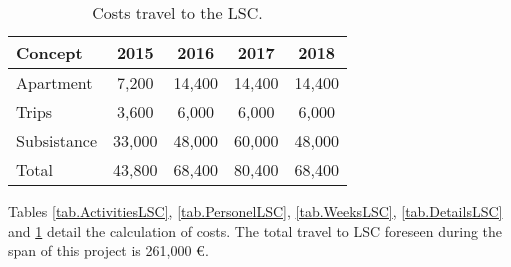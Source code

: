 \begin{table}[h!]
\begin{center}
\begin{tabular}{|l|c|c|c|c|}
\hline	
Concept &	2015 &	2016 &	2017 &	2018\\
\hline						
Apartment	 & 7,200 &	14,400 &	14,400 &14,400 \\
Trips	& 3,600 &	6,000 &	6,000 &	6,000 \\
Subsistance &	33,000 &	48,000	& 60,000 & 48,000 \\
\hline
Total &	43,800 &	68,400 &	80,400 &	68,400 \\				
\hline \hline				
\end{tabular}  
\caption{Costs travel to the LSC.}
\label{tab.CostsLSC}
\end{center}
\end{table}

Tables \ref{tab.ActivitiesLSC}, \ref{tab.PersonelLSC},  
\ref{tab.WeeksLSC}, \ref{tab.DetailsLSC} and  \ref{tab.CostsLSC} detail the calculation of costs. The total travel to LSC foreseen during the span of this project is 261,000 \euro.


